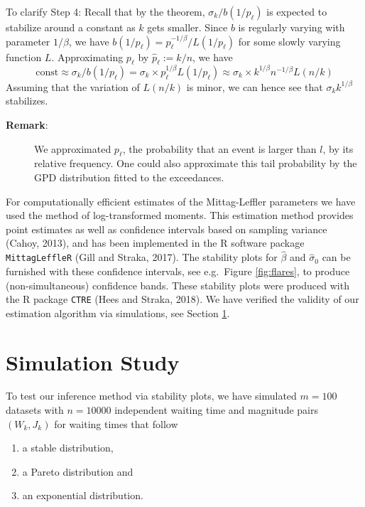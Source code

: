 \documentclass[]{elsarticle} %
\begin{document}
To clarify Step 4: Recall that by the theorem,
\(\sigma_k / b(1/p_{\ell})\) is expected to stabilize around a constant
as \(k\) gets smaller. Since \(b\) is regularly varying with parameter
\(1/\beta\), we have
\(b(1/p_{\ell}) = p_{\ell}^{-1/\beta} / L(1/p_{\ell})\) for some slowly
varying function \(L\). Approximating \(p_{\ell}\) by
\(\hat p_{\ell} := k / n\), we have
\[\text{const} \approx \sigma_k / b(1/p_{\ell}) = \sigma_k \times p_{\ell}^{1/\beta} L(1/p_{\ell}) \approx \sigma_k \times k^{1/\beta} n^{-1/\beta} L(n/k)\]
Assuming that the variation of \(L(n/k)\) is minor, we can hence see
that \(\sigma_k k^{1/\beta}\) stabilizes.

\begin{description}
\item[\textbf{Remark}:]
We approximated \(p_{\ell}\), the probability that an event is larger
than \(l\), by its relative frequency. One could also approximate this
tail probability by the GPD distribution fitted to the exceedances.
\end{description}

For computationally efficient estimates of the Mittag-Leffler parameters
we have used the method of log-transformed moments. This estimation
method provides point estimates as well as confidence intervals based on
sampling variance (Cahoy, 2013), and has been implemented in the R
software package \texttt{MittagLeffleR} (Gill and Straka, 2017). The
stability plots for \(\hat \beta\) and \(\hat \sigma_0\) can be
furnished with these confidence intervals, see e.g.~Figure
\ref{fig:flares}, to produce (non-simultaneous) confidence bands. These
stability plots were produced with the R package \texttt{CTRE} (Hees and
Straka, 2018). We have verified the validity of our estimation algorithm
via simulations, see Section \ref{Simulationstudy}.

\hypertarget{Simulationstudy}{%
\section{Simulation Study}\label{Simulationstudy}}

To test our inference method via stability plots, we have simulated
\(m=100\) datasets with \(n=10000\) independent waiting time and
magnitude pairs \((W_k, J_k)\) for waiting times that follow

\begin{enumerate}
\def\labelenumi{(\roman{enumi})}
\item
  a stable distribution,
\item
  a Pareto distribution and
\item
  an exponential distribution.
\end{enumerate}
\end{document}
